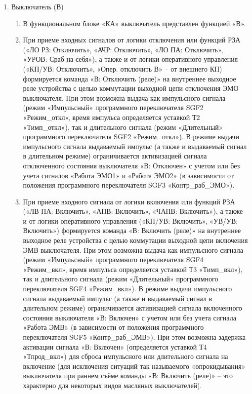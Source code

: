 \begin{enumerate}
\begin{enumerate}
\end{enumerate}

\item Выключатель (В)

\begin{enumerate}

\item
В функциональном блоке «КА» выключатель представлен функцией «В». 

\item
При приеме входных сигналов от логики отключения или функций РЗА («ЛО РЗ: Отключить», «АЧР: Отключить», «ЛО ПА: Отключить», «УРОВ: Сраб на себя»), а также и от логики оперативного управления («КП/УВ: Отключить», «Опер. отключить В» -- от внешнего КП) формируется команда «В: Отключить (реле)» на внутреннее выходное реле устройства с целью коммутации выходной цепи отключения ЭМО выключателя. При этом возможна выдача как импульсного сигнала (режим «Импульсный» программного переключателя SGF2 «Режим\_откл», время импульса определяется уставкой Т2 «Тимп\_откл»), так и длительного сигнала (режим «Длительный» программного переключателя SGF2 «Режим\_откл»). 
В режиме выдачи импульсного сигнала выдаваемый импульс (а также и выдаваемый сигнал в длительном режиме) ограничивается активизацией сигнала отключенного состояния выключателя «В: Отключен» с учетом или без учета сигналов «Работа ЭМО1» и «Работа ЭМО2» (в зависимости от положения программного переключателя SGF3 «Контр\_раб\_ЭМО»).

\item
При приеме входного сигнала от логики включения или функций РЗА («ЛВ ПА: Включить», «АПВ: Включить», «ЧАПВ: Включить»), а также и от логики оперативного управления («КП/УВ: Включить», «УВ/УВ: Включить») формируется команда «В: Включить (реле)» на внутреннее выходное реле устройства с целью коммутации выходной цепи включения ЭМВ выключателя. При этом возможна выдача как импульсного сигнала (режим «Импульсный» программного переключателя SGF4 «Режим\_вкл», время импульса определяется уставкой Т3 «Тимп\_вкл»), так и длительного сигнала (режим «Длительный» программного переключателя SGF4 «Режим\_вкл»).
В режиме выдачи импульсного сигнала выдаваемый импульс (а также и выдаваемый сигнал в длительном режиме) ограничивается активизацией сигнала включенного состояния выключателя «В: Включен» с учетом или без учета сигнала «Работа ЭМВ» (в зависимости от положения программного переключателя SGF5 «Контр\_раб\_ЭМВ»). При этом возможна задержка активации сигнала «В: Включен» (определяется уставкой Т4 «Тпрод\_вкл») для сброса импульсного или длительного сигнала на включение (для исключения ситуаций так называемого «опрокидывания» выключателя при раннем съёме команды «В: Включить (реле)» -- это характерно для некоторых видов масляных выключателей).


\end{enumerate}
\end{enumerate}
